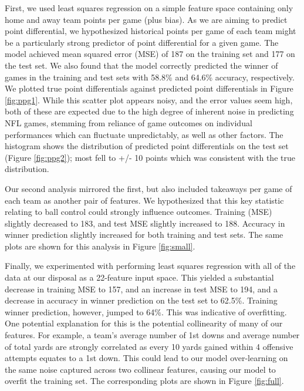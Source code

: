 \documentclass{article}
\begin{document}
First, we used least squares regression on a simple feature space containing only home and away team points per game (plus bias). As we are aiming to predict point differential, we hypothesized historical points per game of each team might be a particularly strong predictor of point differential for a given game.  The model achieved mean squared error (MSE) of 187 on the training set and 177 on the test set. We also found that the model correctly predicted the winner of games in the training and test sets with 58.8\% and 64.6\% accuracy, respectively. We plotted true point differentials against predicted point differentials in Figure \ref{fig:ppg1}. While this scatter plot appears noisy, and the error values seem high, both of these are expected due to the high degree of inherent noise in predicting NFL games, stemming from reliance of game outcomes on individual performances which can fluctuate unpredictably, as well as other factors. The histogram shows the distribution of predicted point differentials on the test set (Figure \ref{fig:ppg2}); most fell to +/- 10 points which was consistent with the true distribution.

Our second analysis mirrored the first, but also included takeaways per game of each team as another pair of features. We hypothesized that this key statistic relating to ball control could strongly influence outcomes. Training (MSE) slightly decreased to 183, and test MSE slightly increased to 188. Accuracy in winner prediction slightly increased for both training and test sets. The same plots are shown for this analysis in Figure \ref{fig:small}.

Finally, we experimented with performing least squares regression with all of the data at our disposal as a 22-feature input space. This yielded a substantial decrease in training MSE to 157, and an increase in test MSE to 194, and a decrease in accuracy in winner prediction on the test set to 62.5\%. Training winner prediction, however, jumped to 64\%. This was indicative of overfitting. One potential explanation for this is the potential collinearity of many of our features. For example, a team’s average number of 1st downs and average number of total yards are strongly correlated as every 10 yards gained within 4 offensive attempts equates to a 1st down. This could lead to our model over-learning on the same noise captured across two collinear features, causing our model to overfit the training set. The corresponding plots are shown in Figure \ref{fig:full}.
\end{document}
